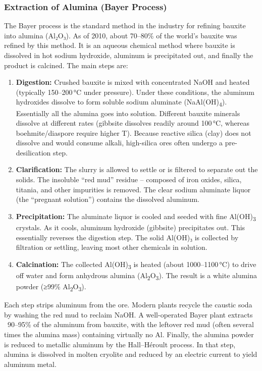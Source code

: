 \documentclass[12pt,a4paper, top=1.9cm, bottom=2.03cm, left=3.81cm, right=1.9cm]{article}
\begin{document}
\subsubsection{Extraction of Alumina (Bayer Process)}
\noindent\fontsize{12}{14}\selectfont The Bayer process is the standard method in the industry for refining bauxite into alumina (Al₂O₃). As of 2010, about 70–80\% of the world’s bauxite was refined by this method. It is an aqueous chemical method where bauxite is dissolved in hot sodium hydroxide, aluminum is precipitated out, and finally the product is calcined. The main steps are:
\begin{enumerate}[label=\arabic*.]  %
    \item \textbf{Digestion:} Crushed bauxite is mixed with concentrated NaOH and heated (typically 150–200 °C under pressure). Under these conditions, the aluminum hydroxides dissolve to form soluble sodium aluminate (NaAl(OH)\textsubscript{4}). Essentially all the alumina goes into solution. Different bauxite minerals dissolve at different rates (gibbsite dissolves readily around 100 °C, whereas boehmite/diaspore require higher T). Because reactive silica (clay) does not dissolve and would consume alkali, high-silica ores often undergo a pre-desilication step.
    \item \textbf{Clarification:} The slurry is allowed to settle or is filtered to separate out the solids. The insoluble “red mud” residue – composed of iron oxides, silica, titania, and other impurities is removed. The clear sodium aluminate liquor (the “pregnant solution”) contains the dissolved aluminum.
    \item \textbf{Precipitation:} The aluminate liquor is cooled and seeded with fine Al(OH)\textsubscript{3} crystals. As it cools, aluminum hydroxide (gibbsite) precipitates out. This essentially reverses the digestion step. The solid Al(OH)₃ is collected by filtration or settling, leaving most other chemicals in solution.
    \item \textbf{Calcination:} The collected Al(OH)\textsubscript{3} is heated (about 1000–1100 °C) to drive off water and form anhydrous alumina (Al\textsubscript{2}O\textsubscript{3}). The result is a white alumina powder (≥99\% Al\textsubscript{2}O\textsubscript{3}).
\end{enumerate}
\noindent\fontsize{12}{14}\selectfont Each step strips aluminum from the ore. Modern plants recycle the caustic soda by washing the red mud to reclaim NaOH. A well-operated Bayer plant extracts ~90–95\% of the aluminum from bauxite, with the leftover red mud (often several times the alumina mass) containing virtually no Al.
\noindent\fontsize{12}{14}\selectfont Finally, the alumina powder is reduced to metallic aluminum by the Hall–Héroult process. In that step, alumina is dissolved in molten cryolite and reduced by an electric current to yield aluminum metal.
\newpage
\end{document}
